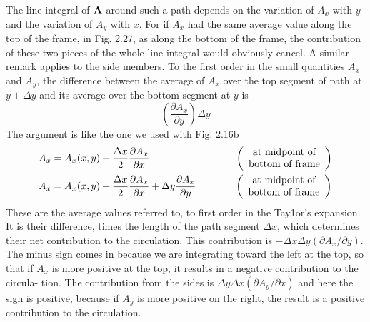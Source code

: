 The line integral of $\mathbf{A}$ around such a path depends on the variation
of $A_x$ with $y$ and the variation of $A_y$ with $x$. For if $A_x$ had the same
average value along the top of the frame, in Fig. 2.27, as along the
bottom of the frame, the contribution of these two pieces of the whole
line integral would obviously cancel. A similar remark applies to
the side members. To the first order in the small quantities $A_x$ and
$A_y$, the difference between the average of $A_x$ over the top segment of
path at $y + \Delta y$ and its average over the bottom segment at $y$ is
\begin{equation}
  \left(\frac{\partial A_x}{\partial y}\right)\Delta y
\end{equation}
The argument is like the one we used with Fig. 2.16b
\begin{align}
\begin{split}
  A_x &= A_x(x,y) + \frac{\Delta x}{2} \frac{\partial A_x}{\partial x} 
         \hspace{30mm} %
             \left(
                  \begin{array}{cc}
                    \text{at midpoint of} \\
                    \text{bottom of frame}
                  \end{array}
             \right) \\
  A_x &= A_x(x,y) + \frac{\Delta x}{2} \frac{\partial A_x}{\partial x}
                  + \Delta y \frac{\partial A_x}{\partial y}
         \hspace{13.5mm} %
             \left(
                  \begin{array}{cc}
                    \text{at midpoint of} \\
                    \text{bottom of frame}
                  \end{array}
             \right)
\end{split}
\end{align}
These are the average values referred to, to first order in the Tay1or's
expansion. It is their difference, times the length of the path segment
$\Delta x$, which determines their net contribution to the circulation. This
contribution is $- \Delta x \Delta y (\partial A_x/\partial y)$. The minus sign comes in because
we are integrating toward the left at the top, so that if $A_x$ is more
positive at the top, it results in a negative contribution to the circula-
tion. The contribution from the sides is $\Delta y \Delta x (\partial A_y/\partial x)$ and here
the sign is positive, because if $A_y$ is more positive on the right, the
result is a positive contribution to the circulation.

